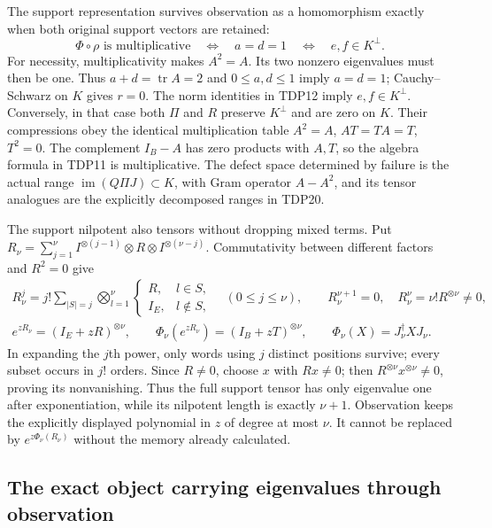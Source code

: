 \documentclass[11pt]{article}
\begin{document}
The support representation survives observation as a homomorphism
exactly when both original support vectors are retained:
\begin{equation}\tag{TDP22}
\Phi\circ\rho\text{ is multiplicative}\quad\Longleftrightarrow\quad
a=d=1\quad\Longleftrightarrow\quad e,f\in K^\perp.
\end{equation}
For necessity, multiplicativity makes $A^2=A$. Its two nonzero
eigenvalues must then be one. Thus $a+d=\operatorname{tr}A=2$ and
$0\le a,d\le1$ imply $a=d=1$; Cauchy--Schwarz on $K$ gives $r=0$.
The norm identities in TDP12 imply $e,f\in K^\perp$. Conversely, in
that case both $\Pi$ and $R$ preserve $K^\perp$ and are zero on $K$.
Their compressions obey the identical multiplication table
$A^2=A$, $AT=TA=T$, $T^2=0$. The complement $I_B-A$ has zero products
with $A,T$, so the algebra formula in TDP11 is multiplicative.
The defect space determined by failure is the actual range
$\operatorname{im}(Q\Pi J)\subset K$, with Gram operator $A-A^2$,
and its tensor analogues are the explicitly decomposed ranges in TDP20.

The support nilpotent also tensors without dropping mixed terms. Put
$R_\nu=\sum_{j=1}^\nu I^{\otimes(j-1)}\otimes R\otimes I^{\otimes(\nu-j)}$.
Commutativity between different factors and $R^2=0$ give
\begin{equation}\tag{TDP23}
\begin{gathered}
R_\nu^j=j!\sum_{|S|=j}\bigotimes_{l=1}^\nu
 \begin{cases}R,&l\in S,\\I_E,&l\notin S,\end{cases}
\quad (0\le j\le\nu),\qquad
R_\nu^{\nu+1}=0,\quad R_\nu^\nu=\nu!R^{\otimes\nu}\ne0,\\
e^{zR_\nu}=(I_E+zR)^{\otimes\nu},\qquad
\Phi_\nu(e^{zR_\nu})=(I_B+zT)^{\otimes\nu},\qquad
\Phi_\nu(X)=J_\nu^\dagger XJ_\nu.
\end{gathered}
\end{equation}
In expanding the $j$th power, only words using $j$ distinct positions
survive; every subset occurs in $j!$ orders. Since $R\ne0$, choose $x$
with $Rx\ne0$; then $R^{\otimes\nu}x^{\otimes\nu}\ne0$, proving its
nonvanishing. Thus the full support tensor has only eigenvalue one
after exponentiation, while its nilpotent length is exactly $\nu+1$.
Observation keeps the explicitly displayed polynomial in $z$ of degree
at most $\nu$. It cannot be replaced by $e^{z\Phi_\nu(R_\nu)}$ without
the memory already calculated.

\subsection{The exact object carrying eigenvalues through observation}
\end{document}
